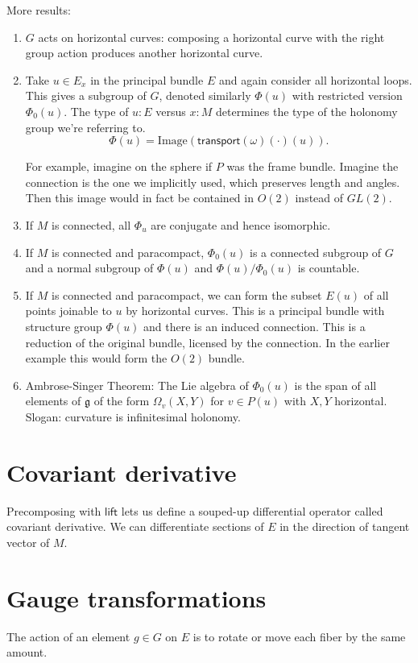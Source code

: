 \documentclass[12pt]{article}
\newcommand{\lift}{\ensuremath{\textsf{lift}}}
\newcommand{\transport}{\ensuremath{\textsf{transport}}}
\newcommand{\image}{\mathrm{Image}}
\begin{document}
More results:
\begin{enumerate}
    \item $G$ acts on horizontal curves: composing a horizontal curve with the right group action produces another horizontal curve.
    \item Take $u\in E_x$ in the principal bundle $E$ and again consider all horizontal loops. This gives a subgroup of $G$, denoted similarly $\Phi(u)$ with restricted version $\Phi_0(u)$. The type of $u:E$ versus $x:M$ determines the type of the holonomy group we're referring to. $$\Phi(u) = \image(\transport(\omega)(\cdot)(u)).$$
    
	For example, imagine on the sphere if $P$ was the frame bundle. Imagine the connection is the one we implicitly used, which preserves length and angles. Then this image would in fact be contained in $O(2)$ instead of $GL(2)$.
    \item If $M$ is connected, all $\Phi_u$ are conjugate and hence isomorphic.
    \item If $M$ is connected and paracompact, $\Phi_0(u)$ is a connected subgroup of $G$ and a normal subgroup of $\Phi(u)$ and $\Phi(u)/\Phi_0(u)$ is countable. 
    \item If $M$ is connected and paracompact, we can form the subset $E(u)$ of all points joinable to $u$ by horizontal curves. This is a principal bundle with structure group $\Phi(u)$ and there is an induced connection. This is a reduction of the original bundle, licensed by the connection. In the earlier example this would form the $O(2)$ bundle.
    \item Ambrose-Singer Theorem: The Lie algebra of $\Phi_0(u)$ is the span of all elements of $\mathfrak{g}$ of the form $\Omega_v(X, Y)$ for $v\in P(u)$ with $X, Y$ horizontal. Slogan: curvature is infinitesimal holonomy.
\end{enumerate}

\section{Covariant derivative}
Precomposing with $\lift$ lets us define a souped-up differential operator called covariant derivative. We can differentiate sections of $E$ in the direction of tangent vector of $M$.
\section{Gauge transformations}
The action of an element $g\in G$ on $E$ is to rotate or move each fiber by the same amount.
\end{document}
